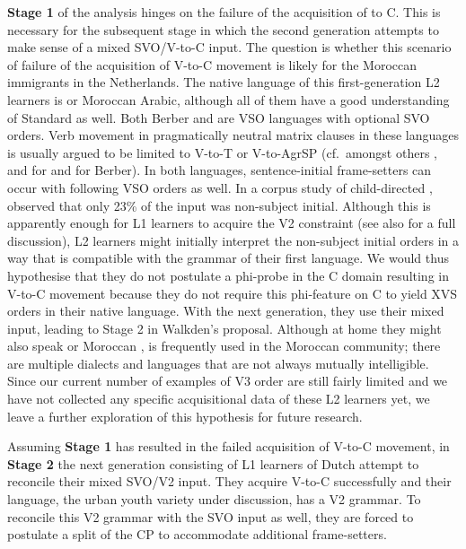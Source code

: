 \documentclass[output=paper]{langsci/langscibook}
\begin{document}
\textbf{Stage 1} of the analysis hinges on the failure of the acquisition of
 to C. This is necessary for the subsequent stage in which the
second generation attempts to make sense of a mixed SVO/V-to-C input. The
question is whether this scenario of failure of the acquisition of V-to-C
movement is likely for the Moroccan immigrants in the Netherlands. The native
language of this first-generation L2 learners is  or Moroccan Arabic,
although all of them have a good understanding of Standard  as well. Both
Berber and  are VSO languages with optional SVO orders. Verb movement in
pragmatically neutral matrix clauses in these languages is usually argued to be
limited to V-to-T or V-to-AgrSP (cf.\ amongst others \citet{Benmamoun:1992a},
\citet{Jouini:2014} and \citet{Shlonsky:2000} for  and \citet{Choe:1987}
for Berber). In both languages, sentence-initial frame-setters can occur with
following VSO orders as well. In a corpus study of child-directed ,
\citet{MacWhinneySnow:1985} observed that only 23\% of the input was
non-subject initial. Although this is apparently enough for  L1 learners
to acquire the V2 constraint (see also \citet[114]{Yang:2000} for a full
discussion), L2 learners might initially interpret the non-subject initial
orders in a way that is compatible with the grammar of their first language. We
would thus hypothesise that they do not postulate a phi-probe in the C domain
resulting in V-to-C movement because they do not require this phi-feature on C
to yield XVS orders in their native language. With the next generation, they
use their mixed input, leading to Stage 2 in Walkden's proposal. Although at
home they might also speak  or Moroccan , 
is frequently used in the Moroccan community; there are multiple dialects and
languages that are not always mutually intelligible. Since our current number
of examples of V3 order are still fairly limited and we have
not collected any specific acquisitional data of these L2 learners yet, we
leave a further exploration of this hypothesis for future research.

Assuming \textbf{Stage 1} has resulted in the failed acquisition of V-to-C
movement, in \textbf{Stage 2} the next generation consisting of L1 learners of
Dutch attempt to reconcile their mixed SVO/V2 input. They acquire V-to-C
successfully and their language, the urban youth variety under discussion, has
a V2 grammar. To reconcile this V2 grammar with the SVO input as well, they are
forced to postulate a split of the CP to accommodate additional frame-setters.
\end{document}
